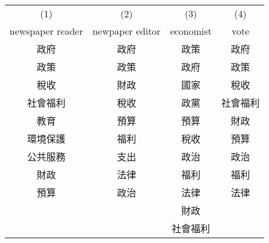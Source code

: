 {
\def\sym#1{\ifmmode^{#1}\else\(^{#1}\)\fi}
\begin{tabular}{c c c c}
\hline\hline

\multicolumn{1}{c}{(1)}
&\multicolumn{1}{c}{(2)}
&\multicolumn{1}{c}{(3)}
&\multicolumn{1}{c}{(4)}
\\

\multicolumn{1}{c}{newspaper reader}
&\multicolumn{1}{c}{newpaper editor}
&\multicolumn{1}{c}{economist}
&\multicolumn{1}{c}{vote}
\\
\hline
政府 & 政府 & 政策 & 政府 \\
政策 & 政策 & 政府 & 政策 \\
稅收 & 財政 & 國家 & 稅收 \\
社會福利 & 稅收 & 政黨 & 社會福利 \\
教育 & 預算 & 預算 & 財政 \\
環境保護 & 福利 & 稅收 & 預算 \\
公共服務 & 支出 & 政治 & 政治 \\
財政 & 法律 & 福利 & 福利 \\
預算 & 政治 & 法律 & 法律 \\
 &  & 財政 &  \\
 &  & 社會福利 &  \\
\hline\hline
\end{tabular}
}
